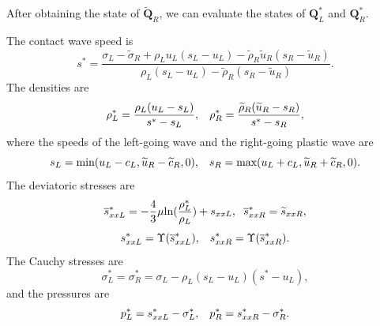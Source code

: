 \documentclass[review]{elsarticle}
\begin{document}
After obtaining the state of $\widetilde{\mathbf{Q}}_R$, we can evaluate the states of $\mathbf{Q}_L^*$ and  $\mathbf{Q}_R^*$.

The contact wave speed is
\begin{equation}
  s^* = \frac{\sigma_L-\widetilde{\sigma}_R+\rho_L u_L(s_L-u_L)-\widetilde{\rho}_R \widetilde{u}_R(s_R-\widetilde{u}_R)}{\rho_L(s_L-u_L)-\widetilde{\rho}_R(s_R-\widetilde{u}_R)}.
\end{equation}
The densities are
\begin{equation}\label{eq:rhoLs}
  \rho_L^* = \frac{\rho_L(u_L-s_L)}{s^*-s_L}, \hspace{0.3cm}  \rho_R^* = \frac{\widetilde{\rho}_R(\widetilde{u}_R-s_R)}{s^*-s_R},
\end{equation}
where the  speeds of the left-going wave and the right-going plastic wave are
    \begin{equation}
      s_L = \text{min} (u_L-c_L, \widetilde{u}_R-\widetilde{c}_R,0), \hspace{0.3cm} s_R = \text{max}(u_L+c_L, \widetilde{u}_R+\widetilde{c}_R,0).
    \end{equation}
    The deviatoric stresses are
\begin{equation}
  \overline{s}_{xxL}^*=-\frac{4}{3}\mu\text{ln}(\frac{\rho_L^*}{\rho_L})+s_{xxL},\hspace{0.2cm}  \overline{s}_{xxR}^*=\widetilde{s}_{xxR},
\end{equation}
\begin{equation}
  s_{xxL}^* = \Upsilon(\overline{s}_{xxL}^*), \hspace{0.3cm}  s_{xxR}^* = \Upsilon(\overline{s}_{xxR}^*).
\end{equation}
The Cauchy stresses are
\begin{equation}
  \sigma_L^*=\sigma_R^*=\sigma_L -\rho_L (s_L-u_L)(s^*-u_L),
\end{equation}
and the pressures are
\begin{equation}
  p_L^* = s_{xxL}^* - \sigma_L^*, \hspace{0.3cm}   p_R^* = s_{xxR}^* - \sigma_R^*.
\end{equation}
\end{document}
